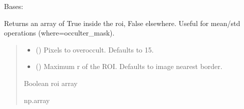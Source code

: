\documentclass[letterpaper,10pt,english]{sphinxmanual}
\begin{document}
\begin{fulllineitems}
\label{\detokenize{micropolarray:micropolarray.cameras.Camera}}
\pysigstartsignatures
{}
\pysigstopsignatures
\sphinxAtStartPar
Bases: 

\begin{fulllineitems}
\label{\detokenize{micropolarray:micropolarray.cameras.Camera.occulter_mask}}
\pysigstartsignatures
{}
\pysigstopsignatures
\sphinxAtStartPar
Returns an array of True inside the roi, False elsewhere. Useful for mean/std operations (where=occulter\_mask).
\begin{quote}\begin{description}
\begin{itemize}
\item {} 
\sphinxAtStartPar
{} (\sphinxstyleliteralemphasis{\sphinxupquote{, }}) \textendash{} Pixels to overoccult. Defaults to 15.

\item {} 
\sphinxAtStartPar
{} (\sphinxstyleliteralemphasis{\sphinxupquote{, }}) \textendash{} Maximum r of the ROI. Defaults to image nearest border.

\end{itemize}

\sphinxAtStartPar
Boolean roi array

\sphinxAtStartPar
np.array

\end{description}\end{quote}


\end{fulllineitems}
\end{fulllineitems}
\end{document}
